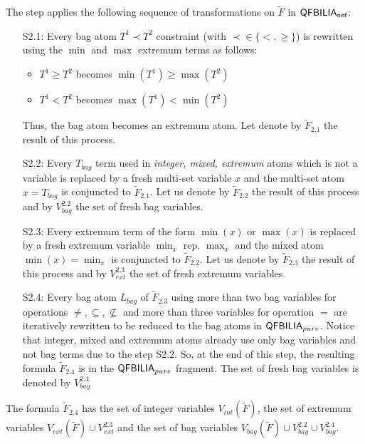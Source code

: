 The step applies the following sequence of transformations on $\tilde{F}$ in $\textsf{QFBILIA}_{\textsf{nnf}}$:
\begin{enumerate}
\item[S2.1:] Every bag atom $T^1 \prec T^2$ constraint (with $\prec \in \{<,\ge\}$) is rewritten using the $\min$ and $\max$ extremum terms as follows:
\begin{itemize}
\item $T^1 \geq T^2$ becomes $\min(T^1) \geq \max(T^2)$
\item $T^1 <    T^2$ becomes $\max(T^1) < \min(T^2)$
\end{itemize}
Thus, the bag atom becomes an extremum atom.
Let denote by $\tilde{F}_{2.1}$ the result of this process.

\item[S2.2:] Every $T_{bag}$ term used in \emph{integer, mixed, extremum} atoms which is not a variable is replaced by a fresh multi-set variable $x$ and the multi-set atom $x=T_{bag}$ is conjuncted to $\tilde{F}_{2.1}$.
Let us denote by $\tilde{F}_{2.2}$ the result of this process and by $V^{2.2}_{bag}$ the set of fresh bag variables.

\item[S2.3:] Every extremum term of the form $\min(x)$ or $\max(x)$ is replaced by a fresh extremum variable $\min_x$ rep. $\max_x$ and the mixed atom $\min(x) = \min_x$ is conjuncted to $\tilde{F}_{2.2}$.
Let us denote by $\tilde{F}_{2.3}$ the result of this process and by $V^{2.3}_{ext}$ the set of fresh extremum variables.

\item[S2.4:] Every bag atom $L_{bag}$ of $\tilde{F}_{2.3}$ using more than two bag variables for operations $\neq, \subseteq, \nsubseteq$ and more than three variables for operation $=$ are iteratively rewritten to be reduced to the bag atoms in $\textsf{QFBILIA}_{pure}$. Notice that integer, mixed and extremum atoms already use only bag variables and not bag terms due to the step S2.2.
So, at the end of this step, the resulting formula $\tilde{F}_{2.4}$ is in the $\textsf{QFBILIA}_{pure}$ fragment. The set of fresh bag variables is denoted by $V^{2.4}_{bag}$
\end{enumerate}
The formula $\tilde{F}_{2.4}$ has the set of integer variables $V_{int}(\tilde{F})$,
the set of extremum variables $V_{ext}(\tilde{F}) \cup V^{2.3}_{ext}$ and
the set of bag variables $V_{bag}(\tilde{F}) \cup V^{2.2}_{bag} \cup V^{2.4}_{bag}$.

